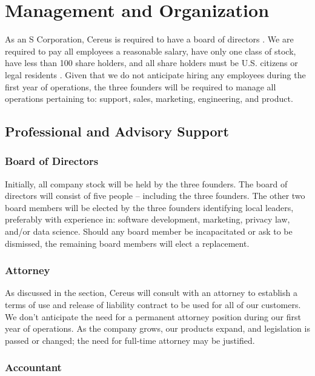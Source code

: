 {\let\cleardoublepage\relax \chapter*{Management and Organization}}

As an S Corporation, Cereus is required to have a board of directors \cite{UpCounsel.2020}. We are required to pay all employees a reasonable salary, have only one class of stock, have less than 100 share holders, and all share holders must be U.S. citizens or legal residents \cite{wave.2019}. Given that we do not anticipate hiring any employees during the first year of operations, the three founders will be required to manage all operations pertaining to: support, sales, marketing, engineering, and product. 

\section{Professional and Advisory Support}

\subsection{Board of Directors}

Initially, all company stock will be held by the three founders. The board of directors will consist of five people -- including the three founders. The other two board members will be elected by the three founders identifying local leaders, preferably with experience in: software development, marketing, privacy law, and/or data science. Should any board member be incapacitated or ask to be dismissed, the remaining board members will elect a replacement.

\subsection{Attorney}

As discussed in the  section, Cereus will consult with an attorney to establish a terms of use and release of liability contract to be used for all of our customers. We don't anticipate the need for a permanent attorney position during our first year of operations. As the company grows, our products expand, and legislation is passed or changed; the need for full-time attorney may be justified. 

\subsection{Accountant}

